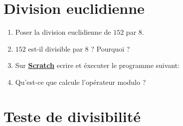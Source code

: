 \def\authors{\jules \ et \href{https://pedagogie.ac-reims.fr/index.php/mathematiques-c4/enseigner-maths-c4/item/3506-divisible-ou-pas}{Académie de Reims}}
\date{2024}
\def\theme{TP : Test de divisibilité}

\def\imgPath{enseignement/4e/divisibilite-et-nombres-premiers/}
\def\imgExtension{.png}
\thispagestyle{assignment}


\vspace*{-1cm}
\vspace*{-0.75cm}

\def\Scratch{\icon{scratch/logo} \textbf{\href{https://scratch.mit.edu/projects/editor/}{\color{Orange}Scratch}} }

\section{Division euclidienne}
\begin{enumerate}
    \item Poser la division euclidienne de $152$ par $8$.
    \item $152$ est-il divisible par $8$ ? Pourquoi ?
    \item Sur \Scratch ecrire et éxecuter le programme suivant:
    \begin{center}\begin{scratch}
    \end{scratch}\end{center}
    \item Qu'est-ce que calcule l'opérateur modulo ?
\end{enumerate}

\vspace*{-0.25cm}
\section{Teste de divisibilité}

